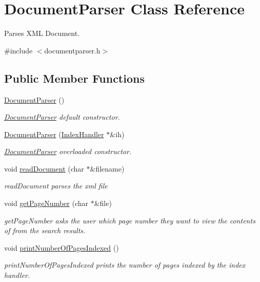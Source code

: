\hypertarget{class_document_parser}{\section{Document\-Parser Class Reference}
\label{class_document_parser}
}


Parses X\-M\-L Document.  




{\ttfamily \#include $<$documentparser.\-h$>$}

\subsection*{Public Member Functions}
\begin{DoxyCompactItemize}
\item 
\hypertarget{class_document_parser_a7a281448c94759450046ab2fb57e7aae}{\hyperlink{class_document_parser_a7a281448c94759450046ab2fb57e7aae}{Document\-Parser} ()}\label{class_document_parser_a7a281448c94759450046ab2fb57e7aae}

\begin{DoxyCompactList}\small\item\em \hyperlink{class_document_parser}{Document\-Parser} default constructor. \end{DoxyCompactList}\item 
\hyperlink{class_document_parser_a4504346e766df5c146df081b2439911d}{Document\-Parser} (\hyperlink{class_index_handler}{Index\-Handler} $\ast$\&ih)
\begin{DoxyCompactList}\small\item\em \hyperlink{class_document_parser}{Document\-Parser} overloaded constructor. \end{DoxyCompactList}\item 
void \hyperlink{class_document_parser_a81d995055d3e5cab74e47db8557ad022}{read\-Document} (char $\ast$\&filename)
\begin{DoxyCompactList}\small\item\em read\-Document parses the xml file \end{DoxyCompactList}\item 
void \hyperlink{class_document_parser_a08d3e204701139484a63593dda11edac}{get\-Page\-Number} (char $\ast$\&file)
\begin{DoxyCompactList}\small\item\em get\-Page\-Number asks the user which page number they want to view the contents of from the search results. \end{DoxyCompactList}\item 
\hypertarget{class_document_parser_a2f6591a1cef19ab16b4901208d1a5495}{void \hyperlink{class_document_parser_a2f6591a1cef19ab16b4901208d1a5495}{print\-Number\-Of\-Pages\-Indexed} ()}\label{class_document_parser_a2f6591a1cef19ab16b4901208d1a5495}

\begin{DoxyCompactList}\small\item\em print\-Number\-Of\-Pages\-Indexed prints the number of pages indexed by the index handler. \end{DoxyCompactList}\end{DoxyCompactItemize}


